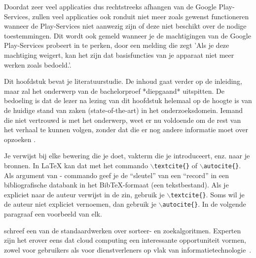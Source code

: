 Doordat zeer veel applicaties dus rechtstreeks afhangen van de Google Play-Services, zullen veel applicaties ook ronduit niet meer zoals gewenst functioneren wanneer de Play-Services niet aanwezig zijn of deze niet beschikt over de nodige toestemmingen. Dit wordt ook gemeld wanneer je de machtigingen van de Google Play-Services probeert in te perken, door een melding die zegt 'Als je deze machtiging weigert, kan het zijn dat basisfuncties van je apparaat niet meer werken zoals bedoeld.'.


Dit hoofdstuk bevat je literatuurstudie. De inhoud gaat verder op de inleiding, maar zal het onderwerp van de bachelorproef *diepgaand* uitspitten. De bedoeling is dat de lezer na lezing van dit hoofdstuk helemaal op de hoogte is van de huidige stand van zaken (state-of-the-art) in het onderzoeksdomein. Iemand die niet vertrouwd is met het onderwerp, weet er nu voldoende om de rest van het verhaal te kunnen volgen, zonder dat die er nog andere informatie moet over opzoeken \autocite{Pollefliet2011}.

Je verwijst bij elke bewering die je doet, vakterm die je introduceert, enz. naar je bronnen. In \LaTeX{} kan dat met het commando \texttt{$\backslash${textcite\{\}}} of \texttt{$\backslash${autocite\{\}}}. Als argument van - commando geef je de ``sleutel'' van een ``record'' in een bibliografische databank in het Bib\TeX{}-formaat (een tekstbestand). Als je expliciet naar de auteur verwijst in de zin, gebruik je \texttt{$\backslash${}textcite\{\}}.
Soms wil je de auteur niet expliciet vernoemen, dan gebruik je \texttt{$\backslash${}autocite\{\}}. In de volgende paragraaf een voorbeeld van elk.

\textcite{Knuth1998} schreef een van de standaardwerken over sorteer- en zoekalgoritmen. Experten zijn het erover eens dat cloud computing een interessante opportuniteit vormen, zowel voor gebruikers als voor dienstverleners op vlak van informatietechnologie~\autocite{Creeger2009}.

\lipsum[7-20]
